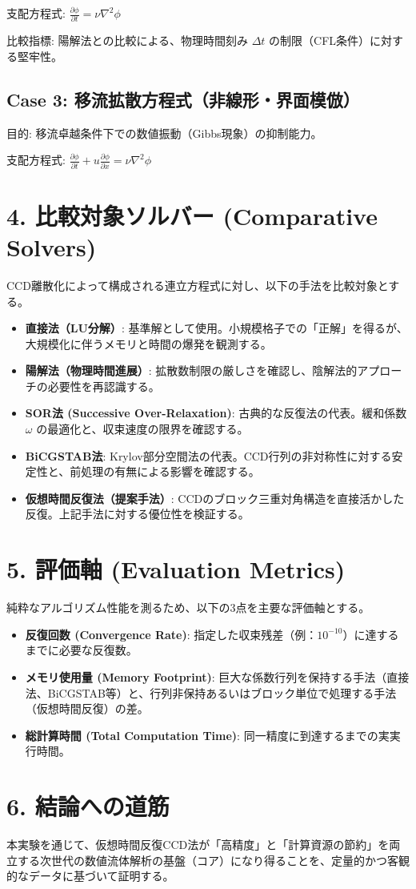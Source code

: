 \documentclass[12pt, a4paper, titlepage]{article}
\begin{document}
支配方程式: $\frac{\partial \phi}{\partial t} = \nu \nabla^2 \phi$

比較指標: 陽解法との比較による、物理時間刻み $\Delta t$ の制限（CFL条件）に対する堅牢性。

\subsection*{Case 3: 移流拡散方程式（非線形・界面模倣）}
目的: 移流卓越条件下での数値振動（Gibbs現象）の抑制能力。

支配方程式: $\frac{\partial \phi}{\partial t} + u \frac{\partial \phi}{\partial x} = \nu \nabla^2 \phi$

\section*{4. 比較対象ソルバー (Comparative Solvers)}
CCD離散化によって構成される連立方程式に対し、以下の手法を比較対象とする。

\begin{itemize}
    \item \textbf{直接法（LU分解）}: 基準解として使用。小規模格子での「正解」を得るが、大規模化に伴うメモリと時間の爆発を観測する。
    \item \textbf{陽解法（物理時間進展）}: 拡散数制限の厳しさを確認し、陰解法的アプローチの必要性を再認識する。
    \item \textbf{SOR法 (Successive Over-Relaxation)}: 古典的な反復法の代表。緩和係数 $\omega$ の最適化と、収束速度の限界を確認する。
    \item \textbf{BiCGSTAB法}: Krylov部分空間法の代表。CCD行列の非対称性に対する安定性と、前処理の有無による影響を確認する。
    \item \textbf{仮想時間反復法（提案手法）}: CCDのブロック三重対角構造を直接活かした反復。上記手法に対する優位性を検証する。
\end{itemize}

\section*{5. 評価軸 (Evaluation Metrics)}
純粋なアルゴリズム性能を測るため、以下の3点を主要な評価軸とする。

\begin{itemize}
    \item \textbf{反復回数 (Convergence Rate)}: 指定した収束残差（例：$10^{-10}$）に達するまでに必要な反復数。
    \item \textbf{メモリ使用量 (Memory Footprint)}: 巨大な係数行列を保持する手法（直接法、BiCGSTAB等）と、行列非保持あるいはブロック単位で処理する手法（仮想時間反復）の差。
    \item \textbf{総計算時間 (Total Computation Time)}: 同一精度に到達するまでの実実行時間。
\end{itemize}

\section*{6. 結論への道筋}
本実験を通じて、仮想時間反復CCD法が「高精度」と「計算資源の節約」を両立する次世代の数値流体解析の基盤（コア）になり得ることを、定量的かつ客観的なデータに基づいて証明する。
\end{document}
